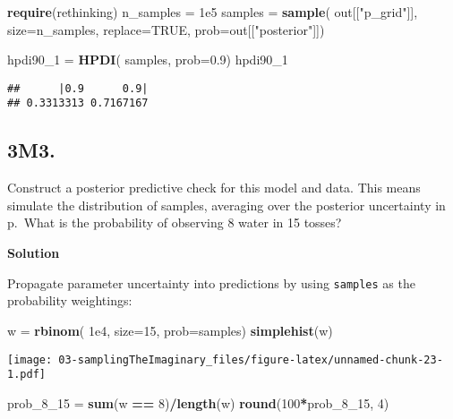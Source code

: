 \documentclass[
]{book}
\newenvironment{Shaded}{\begin{snugshade}}{\end{snugshade}}
\newcommand{\DataTypeTok}[1]{\textcolor[rgb]{0.13,0.29,0.53}{#1}}
\newcommand{\DecValTok}[1]{\textcolor[rgb]{0.00,0.00,0.81}{#1}}
\newcommand{\FloatTok}[1]{\textcolor[rgb]{0.00,0.00,0.81}{#1}}
\newcommand{\KeywordTok}[1]{\textcolor[rgb]{0.13,0.29,0.53}{\textbf{#1}}}
\newcommand{\NormalTok}[1]{#1}
\newcommand{\OperatorTok}[1]{\textcolor[rgb]{0.81,0.36,0.00}{\textbf{#1}}}
\newcommand{\OtherTok}[1]{\textcolor[rgb]{0.56,0.35,0.01}{#1}}
\newcommand{\StringTok}[1]{\textcolor[rgb]{0.31,0.60,0.02}{#1}}
\begin{document}
\begin{Shaded}
\begin{Highlighting}[]
\KeywordTok{require}\NormalTok{(rethinking)}
\NormalTok{n_samples =}\StringTok{ }\FloatTok{1e5}
\NormalTok{samples =}\StringTok{ }\KeywordTok{sample}\NormalTok{( out[[}\StringTok{"p_grid"}\NormalTok{]], }
                  \DataTypeTok{size=}\NormalTok{n_samples, }
                  \DataTypeTok{replace=}\OtherTok{TRUE}\NormalTok{, }
                  \DataTypeTok{prob=}\NormalTok{out[[}\StringTok{"posterior"}\NormalTok{]])}

\NormalTok{hpdi90_}\DecValTok{1}\NormalTok{ =}\StringTok{ }\KeywordTok{HPDI}\NormalTok{( samples, }\DataTypeTok{prob=}\FloatTok{0.9}\NormalTok{)}
\NormalTok{hpdi90_}\DecValTok{1}
\end{Highlighting}
\end{Shaded}

\begin{verbatim}
##      |0.9      0.9| 
## 0.3313313 0.7167167
\end{verbatim}

\hypertarget{m3.}{%
\subsection{3M3.}\label{m3.}}

Construct a posterior predictive check for this model and data. This means simulate the distribution of samples, averaging over the posterior uncertainty in p.~What is the probability of observing 8 water in 15 tosses?

\textbf{Solution}

Propagate parameter uncertainty into predictions by using \texttt{samples} as the probability weightings:

\begin{Shaded}
\begin{Highlighting}[]
\NormalTok{w =}\StringTok{ }\KeywordTok{rbinom}\NormalTok{( }\FloatTok{1e4}\NormalTok{, }\DataTypeTok{size=}\DecValTok{15}\NormalTok{, }\DataTypeTok{prob=}\NormalTok{samples)}
\KeywordTok{simplehist}\NormalTok{(w)}
\end{Highlighting}
\end{Shaded}

\texttt{[image: 03-samplingTheImaginary\_files/figure-latex/unnamed-chunk-23-1.pdf]}

\begin{Shaded}
\begin{Highlighting}[]
\NormalTok{prob_}\DecValTok{8}\NormalTok{_}\DecValTok{15}\NormalTok{ =}\StringTok{ }\KeywordTok{sum}\NormalTok{(w }\OperatorTok{==}\StringTok{ }\DecValTok{8}\NormalTok{)}\OperatorTok{/}\KeywordTok{length}\NormalTok{(w)}
\KeywordTok{round}\NormalTok{(}\DecValTok{100}\OperatorTok{*}\NormalTok{prob_}\DecValTok{8}\NormalTok{_}\DecValTok{15}\NormalTok{, }\DecValTok{4}\NormalTok{)}
\end{Highlighting}
\end{Shaded}
\end{document}
